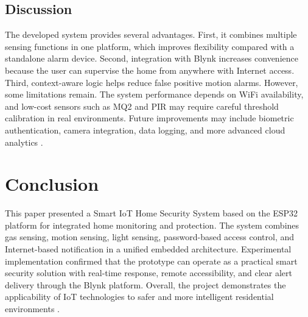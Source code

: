\documentclass[conference]{IEEEtran}
\begin{document}
\subsection{Discussion}
The developed system provides several advantages. First, it combines multiple sensing functions in one platform, which improves flexibility compared with a standalone alarm device. Second, integration with Blynk increases convenience because the user can supervise the home from anywhere with Internet access. Third, context-aware logic helps reduce false positive motion alarms. However, some limitations remain. The system performance depends on WiFi availability, and low-cost sensors such as MQ2 and PIR may require careful threshold calibration in real environments. Future improvements may include biometric authentication, camera integration, data logging, and more advanced cloud analytics \cite{stojkoska2017review,gunawan2018performance}.

\section{Conclusion}
This paper presented a Smart IoT Home Security System based on the ESP32 platform for integrated home monitoring and protection. The system combines gas sensing, motion sensing, light sensing, password-based access control, and Internet-based notification in a unified embedded architecture. Experimental implementation confirmed that the prototype can operate as a practical smart security solution with real-time response, remote accessibility, and clear alert delivery through the Blynk platform. Overall, the project demonstrates the applicability of IoT technologies to safer and more intelligent residential environments \cite{al2020smart,taiwo2021internet,iqbal2018interoperable}.
\end{document}
